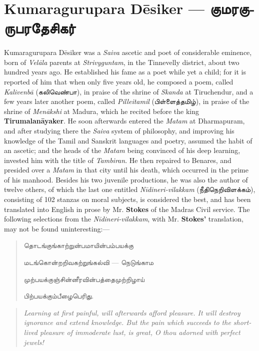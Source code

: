 \documentclass{article}
\newcommand{\TamilText}[1]{\texttamil{#1}}
\newcommand{\TamilBold}[1]{\texttamil{\textbf{#1}}}
\newcommand{\tam}[1]{\TamilText{#1}}
\newcommand{\tambold}[1]{\TamilBold{#1}}
\begin{document}
\section{Kumaragurupara D\={e}siker --- \tambold{குமரகுருபரதேசிகர்}}
\paragraph{}
Kumaragurupara D\={e}siker was a \emph{Saiva} ascetic and poet of considerable eminence, born of \emph{Vel\={a}la} parents at \emph{Strivyguntam}, in the Tinnevelly district, about two hundred years ago. He established his fame as a poet while yet a child; for it is reported of him that when only five years old, he composed a poem, called \emph{Kalivenb\={a}} (\tam{கலிவெண்பா}), in praise of the shrine of \emph{Skanda} at Tiruchendur, and a few years later another poem, called \emph{Pilleitamil} (\tam{பிள்ளைத்தமிழ்}), in praise of the shrine of \emph{Men\={a}kshi} at Madura, which he recited before the king \textbf{Tirumalan\={a}yaker}. He soon afterwards entered the \emph{Matam} at Dharmapuram, and after studying there the \emph{Saiva} system of philosophy, and improving his knowledge of the Tamil and Sanskrit languages and poetry, assumed the habit of an ascetic; and the heads of the \emph{Matam} being convinced of his deep learning, invested him with the title of \emph{Tambiran}. He then repaired to Benares, and presided over a \emph{Matam} in that city until his death, which occurred in the prime of his manhood. Besides his two juvenile productions, he was also the author of twelve others, of which the last one entitled \emph{N\={i}dineri-vilakkam} (\tam{நீதிநெறிவிளக்கம்}), consisting of 102 stanzas on moral subjects, is considered the best, and has been translated into English in prose by Mr. \textbf{Stokes} of the Madras Civil service. The following selections from the \emph{N\={i}dineri-vilakkam}, with Mr. \textbf{Stokes'} translation, may not be found uninteresting:---
\begin{quotation}\small
\tam{தொடங்குங்காற்றுன்பமாயின்பம்பயக்கு}

\tam{மடங்கொன்றறிவகற்றுங்கல்‌வி} --- \tam{நெடுங்காம}

\tam{முற்பயக்குஞ்சின்னீரவின்பத்தைமுற்றிழாய்‌}

\tam{பிற்பயக்கும்பீழைபெரிது}.
\end{quotation}
\begin{quotation}\small
\emph{Learning at first painful, will afterwards afford pleasure. It will destroy ignorance and extend knowledge. But the pain which succeeds to the short-lived pleasure of immoderate lust, is great, O thou adorned with perfect jewels!}
\end{quotation}
\end{document}

